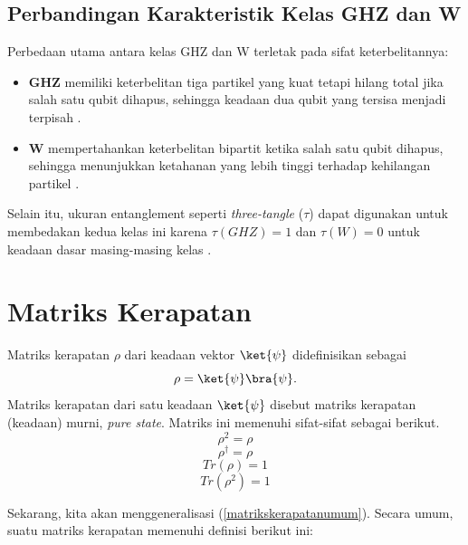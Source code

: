 \subsection{Perbandingan Karakteristik Kelas GHZ dan W}
Perbedaan utama antara kelas GHZ dan W terletak pada sifat keterbelitannya:
\begin{itemize}
	\item {\bf GHZ} memiliki keterbelitan tiga partikel yang kuat tetapi hilang total jika salah satu qubit dihapus, sehingga keadaan dua qubit yang tersisa menjadi terpisah \cite{coffman2000distributed, Jung2008}.
	\item {\bf W} mempertahankan keterbelitan bipartit ketika salah satu qubit dihapus, sehingga menunjukkan ketahanan yang lebih tinggi terhadap kehilangan partikel \cite{Bastin2009, Jung2008}.
\end{itemize}

Selain itu, ukuran entanglement seperti {\it three-tangle} (\(\tau\)) dapat digunakan untuk membedakan kedua kelas ini karena \(\tau(GHZ)=1\) dan \(\tau(W)=0\) untuk keadaan dasar masing-masing kelas \cite{coffman2000distributed}.

\section{Matriks Kerapatan}
Matriks kerapatan $\rho$ dari keadaan vektor $\ket{\psi}$ didefinisikan sebagai
\begin{equation}
    \rho=\ket{\psi}\bra{\psi}.\label{matrikskerapatanumum}
\end{equation}
Matriks kerapatan dari satu keadaan $\ket{\psi}$ disebut matriks kerapatan (keadaan) murni, \textit{pure state}. Matriks ini memenuhi sifat-sifat sebagai berikut.
\begin{equation}
    \rho^2=\rho\label{sifatkerapatan2}
\end{equation}
\begin{equation}
    \rho^\dagger=\rho\label{sifatkerapatan3}
\end{equation}
\begin{equation}
    Tr(\rho)=1\label{sifatkerapatan4}
\end{equation}
\begin{equation}
    Tr(\rho^2)=1\label{sifatkerapatan5}
\end{equation}

\par
Sekarang, kita akan menggeneralisasi (\ref{matrikskerapatanumum}). Secara umum, suatu matriks kerapatan memenuhi definisi berikut ini:

